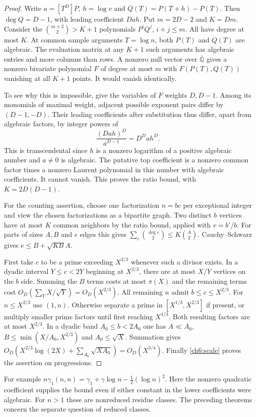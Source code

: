 \documentclass[11pt,a4paper,oneside,openany]{report}
\theoremstyle{remark}\newtheorem{remark}[theorem]{Remark}
\numberwithin{equation}{section}
\begin{document}
\begin{proof}
Write $a=[T^D]P$, $h=\log v$ and $Q(T)=P(T+h)-P(T)$. Then $\deg Q=D-1$, with leading coefficient $Dah$. Put $m=2D-2$ and $K=Dm$. Consider the $\binom{m+2}{2}>K+1$ polynomials $P^iQ^j$, $i+j\le m$. All have degree at most $K$. At common sample arguments $T=\log n$, both $P(T)$ and $Q(T)$ are algebraic. The evaluation matrix at any $K+1$ such arguments has algebraic entries and more columns than rows. A nonzero null vector over $\overline{\mathbb Q}$ gives a nonzero bivariate polynomial $F$ of degree at most $m$ with $F(P(T),Q(T))$ vanishing at all $K+1$ points. It would vanish identically.

To see why this is impossible, give the variables of $F$ weights $D,D-1$. Among its monomials of maximal weight, adjacent possible exponent pairs differ by $(D-1,-D)$. Their leading coefficients after substitution thus differ, apart from algebraic factors, by integer powers of
\[
          \frac{(Dah)^D}{a^{D-1}}=D^D a h^D.
\]
This is transcendental since $h$ is a nonzero logarithm of a positive algebraic number and $a\ne0$ is algebraic. The putative top coefficient is a nonzero common factor times a nonzero Laurent polynomial in this number with algebraic coefficients. It cannot vanish. This proves the ratio bound, with $K=2D(D-1)$.

For the counting assertion, choose one factorization $n=bc$ per exceptional integer and view the chosen factorizations as a bipartite graph. Two distinct $b$ vertices have at most $K$ common neighbors by the ratio bound, applied with $v=b'/b$. For parts of sizes $A,B$ and $e$ edges this gives $\sum_c\binom{\deg c}{2}\le K\binom A2$. Cauchy--Schwarz gives $e\le B+\sqrt{KB}A$.

First take $c$ to be a prime exceeding $X^{2/3}$ whenever such a divisor exists. In a dyadic interval $Y\le c<2Y$ beginning at $X^{2/3}$, there are at most $X/Y$ vertices on the $b$ side. Summing the $B$ terms costs at most $\pi(X)$ and the remaining terms cost $O_D(\sum_YX/\sqrt Y)=O_D(X^{2/3})$. All remaining $n$ admit $b\le c\le X^{2/3}$. For $n\le X^{2/3}$ use $(1,n)$. Otherwise separate a prime in $[X^{1/3},X^{2/3}]$ if present, or multiply smaller prime factors until first reaching $X^{1/3}$. Both resulting factors are at most $X^{2/3}$. In a dyadic band $A_0\le b<2A_0$ one has $A\ll A_0$, $B\le\min(X/A_0,X^{2/3})$ and $A_0\le\sqrt X$. Summation gives $O_D(X^{2/3}\log(2X)+\sum_{A_0}\sqrt{XA_0})=O_D(X^{3/4})$. Finally \eqref{ch6:scale} proves the assertion on progressions.
\end{proof}
For example $n\gamma_1(n,n)=\gamma_1+\gamma\log n-\tfrac12(\log n)^2$. Here the nonzero quadratic coefficient supplies the bound even if either constant in the lower coefficients were algebraic. For $n>1$ these are nonreduced residue classes. The preceding theorems concern the separate question of reduced classes.
\end{document}
